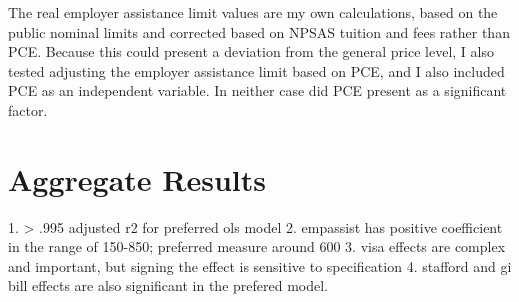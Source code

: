 \documentclass[review]{elsarticle}
\begin{document}
    The real employer assistance limit values are my own calculations,
    based on the public nominal limits and corrected based on NPSAS tuition and fees rather than PCE.
    Because this could present a deviation from the general price level, I also tested adjusting the employer assistance limit based on PCE,
    and I also included PCE as an independent variable. In neither case did PCE present as a significant factor.


    \section{Aggregate Results}

    1. > .995 adjusted r2 for preferred ols model
    2. empassist has positive coefficient in the range of 150-850; preferred measure around 600
    3. visa effects are complex and important, but signing the effect is sensitive to specification
    4. stafford and gi bill effects are also significant in the prefered model.

    
\end{document}
